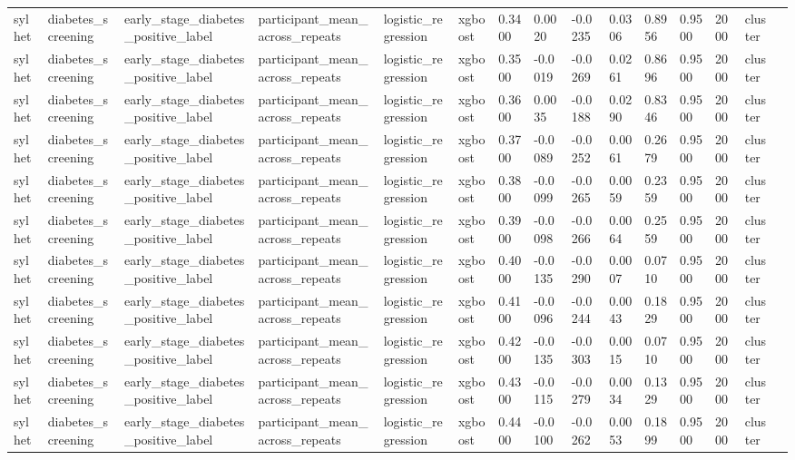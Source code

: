 \begin{tabular}{lllllllllllllll}
sylhet & diabetes\_screening & early\_stage\_diabetes\_positive\_label & participant\_mean\_across\_repeats & logistic\_regression & xgboost & 0.3400 & 0.0020 & -0.0235 & 0.0306 & 0.8956 & 0.9500 & 2000 & cluster &  \\
sylhet & diabetes\_screening & early\_stage\_diabetes\_positive\_label & participant\_mean\_across\_repeats & logistic\_regression & xgboost & 0.3500 & -0.0019 & -0.0269 & 0.0261 & 0.8696 & 0.9500 & 2000 & cluster &  \\
sylhet & diabetes\_screening & early\_stage\_diabetes\_positive\_label & participant\_mean\_across\_repeats & logistic\_regression & xgboost & 0.3600 & 0.0035 & -0.0188 & 0.0290 & 0.8346 & 0.9500 & 2000 & cluster &  \\
sylhet & diabetes\_screening & early\_stage\_diabetes\_positive\_label & participant\_mean\_across\_repeats & logistic\_regression & xgboost & 0.3700 & -0.0089 & -0.0252 & 0.0061 & 0.2679 & 0.9500 & 2000 & cluster &  \\
sylhet & diabetes\_screening & early\_stage\_diabetes\_positive\_label & participant\_mean\_across\_repeats & logistic\_regression & xgboost & 0.3800 & -0.0099 & -0.0265 & 0.0059 & 0.2359 & 0.9500 & 2000 & cluster &  \\
sylhet & diabetes\_screening & early\_stage\_diabetes\_positive\_label & participant\_mean\_across\_repeats & logistic\_regression & xgboost & 0.3900 & -0.0098 & -0.0266 & 0.0064 & 0.2559 & 0.9500 & 2000 & cluster &  \\
sylhet & diabetes\_screening & early\_stage\_diabetes\_positive\_label & participant\_mean\_across\_repeats & logistic\_regression & xgboost & 0.4000 & -0.0135 & -0.0290 & 0.0007 & 0.0710 & 0.9500 & 2000 & cluster &  \\
sylhet & diabetes\_screening & early\_stage\_diabetes\_positive\_label & participant\_mean\_across\_repeats & logistic\_regression & xgboost & 0.4100 & -0.0096 & -0.0244 & 0.0043 & 0.1829 & 0.9500 & 2000 & cluster &  \\
sylhet & diabetes\_screening & early\_stage\_diabetes\_positive\_label & participant\_mean\_across\_repeats & logistic\_regression & xgboost & 0.4200 & -0.0135 & -0.0303 & 0.0015 & 0.0710 & 0.9500 & 2000 & cluster &  \\
sylhet & diabetes\_screening & early\_stage\_diabetes\_positive\_label & participant\_mean\_across\_repeats & logistic\_regression & xgboost & 0.4300 & -0.0115 & -0.0279 & 0.0034 & 0.1329 & 0.9500 & 2000 & cluster &  \\
sylhet & diabetes\_screening & early\_stage\_diabetes\_positive\_label & participant\_mean\_across\_repeats & logistic\_regression & xgboost & 0.4400 & -0.0100 & -0.0262 & 0.0053 & 0.1899 & 0.9500 & 2000 & cluster &  \\

\end{tabular}
